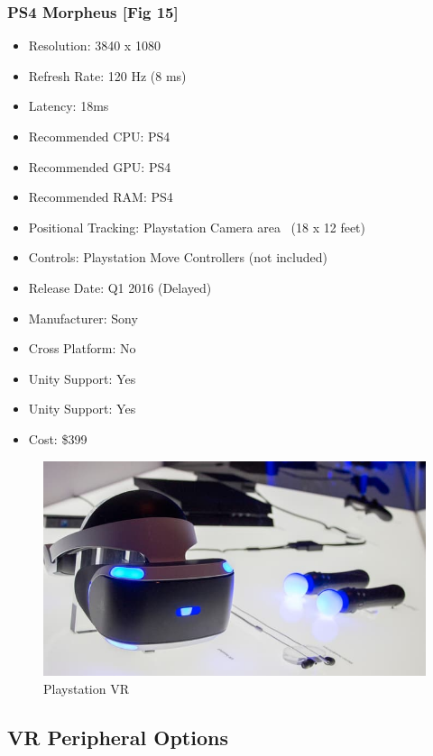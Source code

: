 \documentclass[a4paper,10pt]{article}
\begin{document}
\subsubsection{PS4 Morpheus [Fig 15]}
\begin{itemize}
  \item Resolution: 3840 x 1080 
  \item Refresh Rate: 120 Hz (8 ms)
  \item Latency: 18ms
  \item Recommended CPU: PS4
  \item Recommended GPU: PS4
  \item Recommended RAM: PS4
  \item Positional Tracking: Playstation Camera area ~(18 x 12 feet)
  \item Controls: Playstation Move Controllers (not included)
  \item Release Date: Q1 2016 (Delayed)
  \item Manufacturer: Sony
  \item Cross Platform: No
    \item Unity Support: Yes
  \item Unity Support: Yes
  \item Cost: \$399
\end{itemize}
\begin{figure}[H]
	\includegraphics[width=\linewidth,height=\paperheight,keepaspectratio]{morpheus.jpg}
	\caption{Playstation VR}
	\label{fig:psvrImg}
\end{figure}
	\pagebreak
	
\pagebreak
\subsection{VR Peripheral Options}
\label{section:peripheral}
\end{document}
